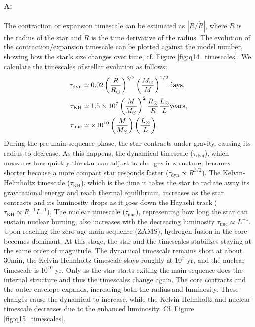 \documentclass[twocolumn,fontsize=11pt]{scrartcl}
\begin{document}
\paragraph{A:} The contraction or expansion timescale can be estimated as \(\left|R/\dot{R}\right|\), where \(R\) is the radius of the star and \(\dot{R}\) is the time derivative of the radius. The evolution of the contraction/expansion timescale can be plotted against the model number, showing how the star's size changes over time, cf. Figure \ref{fig:q14_timescales}. We calculate the timescales of stellar evolution as follows:
\begin{align*}
    \tau_{\text{dyn}} &\simeq 0.02 \left(\frac{R}{R_\odot}\right)^{3/2} \left(\frac{M_\odot}{M}\right)^{1/2} \text{days}, \\
    \tau_{\text{KH}} &\simeq 1.5 \times 10^7\left(\frac{M}{M_\odot}\right)^{2} \frac{R_\odot}{R}\frac{L_\odot}{L} \text{years}, \\
    \tau_{\text{nuc}} &\simeq \times 10^{10}\left(\frac{M}{M_\odot}\right)\left(\frac{L_\odot}{L}\right)
\end{align*}
During the pre-main sequence phase, the star contracts under gravity, causing its radius to decrease. As this happens, the dynamical timescale (\(\tau_{\text{dyn}}\)), which measures how quickly the star can adjust to changes in structure, becomes shorter because a more compact star responds faster (\(\tau_{\text{dyn}} \propto R^{3/2}\)). The Kelvin-Helmholtz timescale (\(\tau_{\text{KH}}\)), which is the time it takes the star to radiate away its gravitational energy and reach thermal equilibrium, increases as the star contracts and its luminosity drops as it goes down the Hayashi track (\(\tau_{\text{KH}} \propto R^{-1} L^{-1}\)). The nuclear timescale (\(\tau_{\text{nuc}}\)), representing how long the star can sustain nuclear burning, also increases with the decreasing luminosity \(\tau_{\text{nuc}} \propto L^{-1}\). Upon reaching the zero-age main sequence (ZAMS), hydrogen fusion in the core becomes dominant. At this stage, the star and the timescales stabilizes staying at the same order of magnitude. The dynamical timescale remains short at about \(30 \text{min}\), the Kelvin-Helmholtz timescale stays roughly at \(10^7\) yr, and the nuclear timescale is \(10^{10}\) yr. Only as the star starts exiting the main sequence does the internal structure and thus the timescales change again. The core contracts and the outer envelope expands, increasing both the radius and luminosity. These changes cause the dynamical to increase, while the Kelvin-Helmholtz and nuclear timescale decreases due to the enhanced luminosity. Cf. Figure \ref{fig:q15_timescales}.
\end{document}
